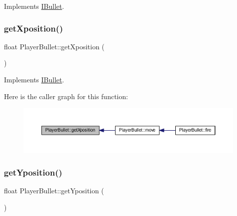 Implements \hyperlink{class_i_bullet_a327968e71126cdea5998076d8919354f}{I\+Bullet}.

\mbox{\label{class_player_bullet_aa9462c44892190316ee479a18693b6ad}} 
\subsubsection{\texorpdfstring{get\+Xposition()}{getXposition()}}
{\footnotesize\ttfamily float Player\+Bullet\+::get\+Xposition (\begin{DoxyParamCaption}{ }\end{DoxyParamCaption})\hspace{0.3cm}{\ttfamily [virtual]}}



Implements \hyperlink{class_i_bullet_a20babdd6c657ddda175e84a56564dcfa}{I\+Bullet}.

Here is the caller graph for this function\+:
\nopagebreak
\begin{figure}[H]
\begin{center}
\leavevmode
\includegraphics[width=350pt]{class_player_bullet_aa9462c44892190316ee479a18693b6ad_icgraph}
\end{center}
\end{figure}
\mbox{\label{class_player_bullet_a240cab35d5d909366986b8661ee65d3c}} 
\subsubsection{\texorpdfstring{get\+Yposition()}{getYposition()}}
{\footnotesize\ttfamily float Player\+Bullet\+::get\+Yposition (\begin{DoxyParamCaption}{ }\end{DoxyParamCaption})\hspace{0.3cm}{\ttfamily [virtual]}}



